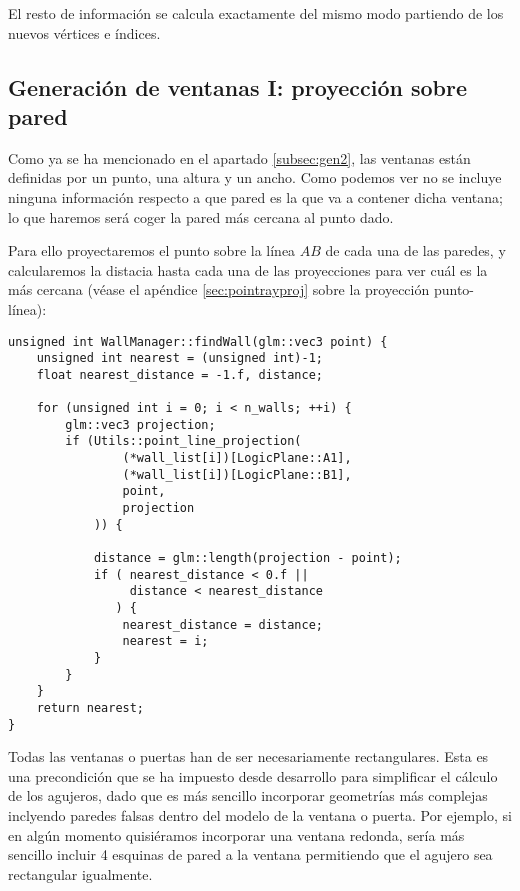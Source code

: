 El resto de información se calcula exactamente del mismo modo partiendo de los nuevos vértices e índices.

\clearpage
\subsection{Generación de ventanas I: proyección sobre pared}
Como ya se ha mencionado en el apartado \ref{subsec:gen2}, las ventanas están definidas por un punto, una altura y un ancho. Como podemos ver no se incluye ninguna información respecto a que pared es la que va a contener dicha ventana; lo que haremos será coger la pared más cercana al punto dado.

Para ello proyectaremos el punto sobre la línea $AB$ de cada una de las paredes, y calcularemos la distacia hasta cada una de las proyecciones para ver cuál es la más cercana (véase el apéndice \ref{sec:pointrayproj} sobre la proyección punto-línea):

\begin{lstlisting}
unsigned int WallManager::findWall(glm::vec3 point) {
	unsigned int nearest = (unsigned int)-1;
	float nearest_distance = -1.f, distance;
	
	for (unsigned int i = 0; i < n_walls; ++i) {
		glm::vec3 projection;
		if (Utils::point_line_projection(
		        (*wall_list[i])[LogicPlane::A1], 
		        (*wall_list[i])[LogicPlane::B1], 
		        point, 
		        projection
		    )) {
			
			distance = glm::length(projection - point);
			if ( nearest_distance < 0.f || 
			     distance < nearest_distance
			   ) {
				nearest_distance = distance;
				nearest = i;
			}
		}
	}
	return nearest;
}
\end{lstlisting}

Todas las ventanas o puertas han de ser necesariamente rectangulares. Esta es una precondición que se ha impuesto desde desarrollo para simplificar el cálculo de los agujeros, dado que es más sencillo incorporar geometrías más complejas inclyendo paredes falsas dentro del modelo de la ventana o puerta. Por ejemplo, si en algún momento quisiéramos incorporar una ventana redonda, sería más sencillo incluir 4 esquinas de pared a la ventana permitiendo que el agujero sea rectangular igualmente.

